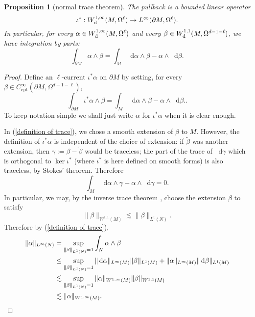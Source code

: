 \documentclass[reqno,11pt]{amsart}
\newcommand*\dif{\mathop{}\!\mathrm{d}}
\newcommand{\cpt}{\mathrm{cpt}}
\newtheorem{proposition}[theorem]{Proposition}
\theoremstyle{definition}
\numberwithin{equation}{section}
\begin{document}
\begin{proposition}[normal trace theorem]
The pullback is a bounded linear operator 
$$\iota^*: W^{1, \infty}_{\rm d}(M, \Omega^\ell) \to L^\infty(\partial M, \Omega^\ell).$$
In particular, for every $\alpha \in W^{1, \infty}_{\rm d}(M, \Omega^\ell)$ and every $\beta \in W^{1, 1}_{\rm d}(M, \Omega^{d - 1 - \ell})$, we have integration by parts:
\begin{equation}\label{Stokes trace}
	\int_{\partial M} \alpha \wedge \beta = \int_M \dif \alpha \wedge \beta - \alpha \wedge \dif \beta.
\end{equation}
\end{proposition}
\begin{proof}
Define an $\ell$-current $\iota^* \alpha$ on $\partial M$ by setting, for every $\beta \in C^\infty_\cpt(\partial M, \Omega^{d - 1 - \ell})$,
\begin{equation}\label{definition of trace}
\int_{\partial M} \iota^* \alpha \wedge \beta = \int_M \dif \alpha \wedge \beta - \alpha \wedge \dif \beta..
\end{equation}
To keep notation simple we shall just write $\alpha$ for $\iota^* \alpha$ when it is clear enough.

In (\ref{definition of trace}), we chose a smooth extension of $\beta$ to $M$.
However, the definition of $\iota^* \alpha$ is independent of the choice of extension: if $\tilde \beta$ was another extension, then $\gamma := \beta - \tilde \beta$ would be traceless; the part of the trace of $\dif \gamma$ which is orthogonal to $\ker \iota^*$ (where $\iota^*$ is here defined on smooth forms) is also traceless, by Stokes' theorem.
Therefore
$$\int_M \dif \alpha \wedge \gamma + \alpha \wedge \dif \gamma = 0.$$
In particular, we may, by the inverse trace theorem \cite[Teorema 1.II]{Gagliardo1957}, choose the extension $\beta$ to satisfy 
$$\|\beta\|_{W^{1, 1}(M)} \lesssim \|\beta\|_{L^1(N)}.$$
Therefore by (\ref{definition of trace}), 
\begin{align*}
\|\alpha\|_{L^\infty(N)} 
&= \sup_{\|\beta\|_{L^1(N)} = 1} \int_N \alpha \wedge \beta\\
&\leq \sup_{\|\beta\|_{L^1(N)} = 1} \|\dif \alpha\|_{L^\infty(M)} \|\beta\|_{L^1(M)} + \|\alpha\|_{L^\infty(M)} \|\dif \beta\|_{L^1(M)} \\
&\lesssim \sup_{\|\beta\|_{L^1(N)} = 1} \|\alpha\|_{W^{1, \infty}(M)} \|\beta\|_{W^{1, 1}(M)} \\
&\lesssim \|\alpha\|_{W^{1, \infty}(M)}. \qedhere
\end{align*}
\end{proof}
\end{document}
